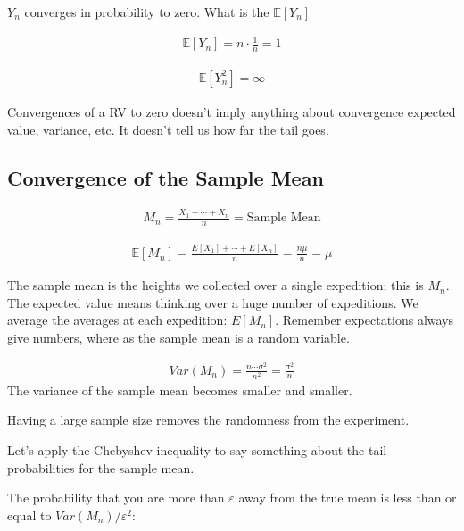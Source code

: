 $Y_n$ converges in probability to zero.
What is the $\mathbb{E}[Y_n]$

\begin{align*}
    \mathbb{E}[Y_n] = n\cdot\frac{1}{n} = 1
\end{align*}

\begin{align*}
    \mathbb{E}[Y_n^2] = \infty
\end{align*}

 Convergences of a RV to zero doesn't imply anything about  convergence expected value, variance, etc.  It doesn't tell us how far the tail goes.

\subsection{Convergence of the Sample Mean}


\begin{align*}
    M_n = \frac{X_1 + \cdots + X_n}{n} = \text{Sample Mean}
\end{align*}

\begin{align*}
    \mathbb{E}[M_n] = \frac{E[X_1] + \cdots + E[X_n]}{n} = \frac{n \mu}{n} = \mu
\end{align*}

 The sample mean is the heights we collected over a single expedition; this is $M_n$.  The expected value means thinking over a huge number of expeditions.  We average the averages at each expedition: $E[M_n]$.  Remember expectations always give numbers, where as the sample mean is a random variable.

\begin{align*}
    Var(M_n) = \frac{n \cdots \sigma^2}{n^2} = \frac{\sigma^2}{n}
\end{align*}
The variance of the sample mean becomes smaller and smaller.

Having a large sample size removes the randomness from the experiment.

Let's apply the Chebyshev inequality to say something about the tail probabilities for the sample mean.

The probability that you are more than $\varepsilon$ away from the true mean is less than or equal to $Var(M_n)/\varepsilon^2$:

